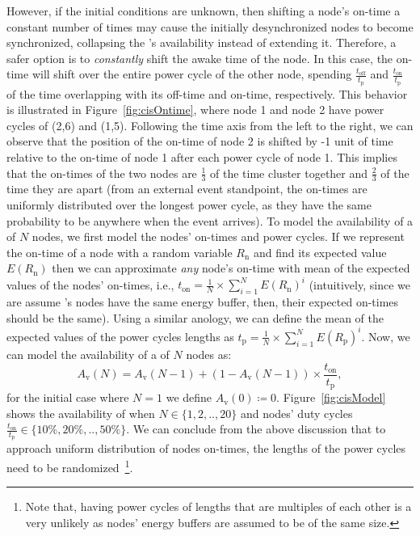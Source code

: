 However, if the initial conditions are unknown, then shifting a node's on-time a constant number of times may cause the initially desynchronized nodes to become synchronized, collapsing the \sys's availability instead of extending it. Therefore, a safer option is to \emph{constantly} shift the awake time of the node. In this case, the on-time will shift over the entire power cycle of the other node, spending $\frac{ t_\text{off} }{t_\text{p}}$ and $\frac{ t_\text{on} }{t_\text{p}}$ of the time overlapping with its off-time and on-time, respectively. This behavior is illustrated in Figure~\ref{fig:cisOntime}, where node 1 and node 2 have power cycles of (2,6) and (1,5). Following the time axis from the left to the right, we can observe that the position of the on-time of node 2 is shifted by -1 unit of time relative to the on-time of node 1 after each power cycle of node 1. This implies that the on-times of the two nodes are $\frac{1}{3}$ of the time cluster together and $\frac{2}{3}$ of the time they are apart (from an external event standpoint, the on-times are uniformly distributed over the longest power cycle, as they have the same probability to be anywhere when the event arrives). To model the availability of a \sys of $N$ nodes, we first model the nodes' on-times and power cycles.
%
If we represent the on-time of a node with a random variable $R_\text{n}$ and find its expected value $E(R_\text{n})$ then we can approximate \emph{any} \sys node's on-time with mean of the expected values of the nodes' on-times, i.e., $t_\text{on} = \frac{1}{N} \times \sum_{i=1}^{N} E(R_\text{n})^i$ (intuitively, since we are assume \sys's nodes have the same energy buffer, then, their expected on-times should be the same). Using a similar anology, we can define the mean of the expected values of the power cycles lengths as $t_\text{p} = \frac{1}{N} \times \sum_{i=1}^{N} E(R_\text{p})^i$. Now, we can model the availability of a \sys of $N$ nodes as:
%
%	
\begin{equation}
	A_\text{v}(N) = A_\text{v}(N-1) + \left(1-A_\text{v}(N-1)\right) \times \frac{t_\text{on}}{t_\text{p}},
		\label{eq:cisModel}
\end{equation}
%
for the initial case where $N=1$ we define $A_\text{v}(0)\coloneqq 0$. Figure~\ref{fig:cisModel} shows the availability of \sys when $N\in\{1,2,..,20\}$ and nodes' duty cycles $\frac{t_\text{on}}{t_\text{p}}\in\{10\%,20\%,..,50\%\}$.
%
We can conclude from the above discussion that to approach uniform distribution of nodes on-times, the lengths of the power cycles need to be randomized~\footnote{Note that, having power cycles of lengths that are multiples of each other is a very unlikely as nodes' energy buffers are assumed to be of the same size.}. 

